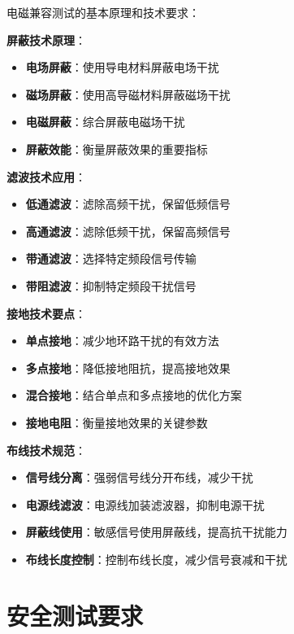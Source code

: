 \documentclass[12pt,UTF8]{ctexbook}
\begin{document}
电磁兼容测试的基本原理和技术要求：

\textbf{屏蔽技术原理}：
\begin{itemize}[leftmargin=3.5em]
    \item \textbf{电场屏蔽}：使用导电材料屏蔽电场干扰
    \item \textbf{磁场屏蔽}：使用高导磁材料屏蔽磁场干扰
    \item \textbf{电磁屏蔽}：综合屏蔽电磁场干扰
    \item \textbf{屏蔽效能}：衡量屏蔽效果的重要指标
\end{itemize}

\textbf{滤波技术应用}：
\begin{itemize}[leftmargin=3.5em]
    \item \textbf{低通滤波}：滤除高频干扰，保留低频信号
    \item \textbf{高通滤波}：滤除低频干扰，保留高频信号
    \item \textbf{带通滤波}：选择特定频段信号传输
    \item \textbf{带阻滤波}：抑制特定频段干扰信号
\end{itemize}

\textbf{接地技术要点}：
\begin{itemize}[leftmargin=3.5em]
    \item \textbf{单点接地}：减少地环路干扰的有效方法
    \item \textbf{多点接地}：降低接地阻抗，提高接地效果
    \item \textbf{混合接地}：结合单点和多点接地的优化方案
    \item \textbf{接地电阻}：衡量接地效果的关键参数
\end{itemize}

\textbf{布线技术规范}：
\begin{itemize}[leftmargin=3.5em]
    \item \textbf{信号线分离}：强弱信号线分开布线，减少干扰
    \item \textbf{电源线滤波}：电源线加装滤波器，抑制电源干扰
    \item \textbf{屏蔽线使用}：敏感信号使用屏蔽线，提高抗干扰能力
    \item \textbf{布线长度控制}：控制布线长度，减少信号衰减和干扰
\end{itemize}

\section{安全测试要求}
\end{document}

